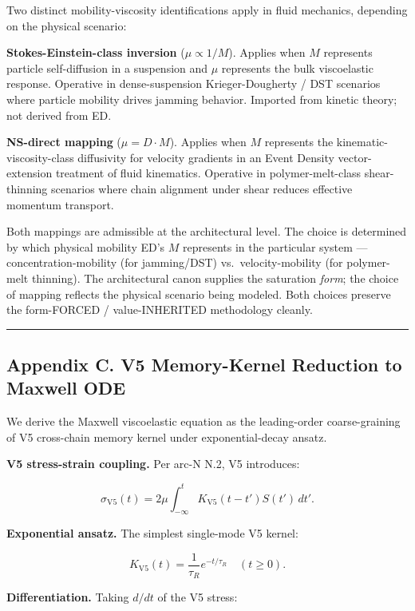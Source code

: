 \documentclass[
  11pt,a4paper]{article}
\begin{document}
Two distinct mobility-viscosity identifications apply in fluid
mechanics, depending on the physical scenario:

\textbf{Stokes-Einstein-class inversion} (\(\mu \propto 1/M\)). Applies
when \(M\) represents particle self-diffusion in a suspension and
\(\mu\) represents the bulk viscoelastic response. Operative in
dense-suspension Krieger-Dougherty / DST scenarios where particle
mobility drives jamming behavior. Imported from kinetic theory; not
derived from ED.

\textbf{NS-direct mapping} (\(\mu = D \cdot M\)). Applies when \(M\)
represents the kinematic-viscosity-class diffusivity for velocity
gradients in an Event Density vector-extension treatment of fluid
kinematics. Operative in polymer-melt-class shear-thinning scenarios
where chain alignment under shear reduces effective momentum transport.

Both mappings are admissible at the architectural level. The choice is
determined by which physical mobility ED's \(M\) represents in the
particular system --- concentration-mobility (for jamming/DST)
vs.~velocity-mobility (for polymer-melt thinning). The architectural
canon supplies the saturation \emph{form}; the choice of mapping
reflects the physical scenario being modeled. Both choices preserve the
form-FORCED / value-INHERITED methodology cleanly.

\begin{center}\rule{0.5\linewidth}{0.5pt}\end{center}

\subsection{Appendix C. V5 Memory-Kernel Reduction to Maxwell
ODE}\label{appendix-c.-v5-memory-kernel-reduction-to-maxwell-ode}

We derive the Maxwell viscoelastic equation as the leading-order
coarse-graining of V5 cross-chain memory kernel under exponential-decay
ansatz.

\textbf{V5 stress-strain coupling.} Per arc-N N.2, V5 introduces:

\[\sigma_\mathrm{V5}(t) = 2\mu \int_{-\infty}^t K_\mathrm{V5}(t - t') S(t') \, dt'.\]

\textbf{Exponential ansatz.} The simplest single-mode V5 kernel:

\[K_\mathrm{V5}(t) = \frac{1}{\tau_R} e^{-t/\tau_R} \quad (t \geq 0).\]

\textbf{Differentiation.} Taking \(d/dt\) of the V5 stress:
\end{document}
